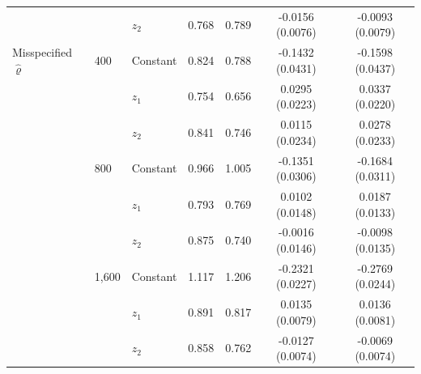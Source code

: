 \begin{tabular}{lllcccc}
 &  & $z_2$ & 0.768 & 0.789 & -0.0156 (0.0076) & -0.0093 (0.0079) \\
\addlinespace
Misspecified $\hat\varrho$ & 400 & Constant & 0.824 & 0.788 & -0.1432 (0.0431) & -0.1598 (0.0437) \\
 &  & $z_1$ & 0.754 & 0.656 & 0.0295 (0.0223) & 0.0337 (0.0220) \\
 &  & $z_2$ & 0.841 & 0.746 & 0.0115 (0.0234) & 0.0278 (0.0233) \\
 & 800 & Constant & 0.966 & 1.005 & -0.1351 (0.0306) & -0.1684 (0.0311) \\
 &  & $z_1$ & 0.793 & 0.769 & 0.0102 (0.0148) & 0.0187 (0.0133) \\
 &  & $z_2$ & 0.875 & 0.740 & -0.0016 (0.0146) & -0.0098 (0.0135) \\
 & 1,600 & Constant & 1.117 & 1.206 & -0.2321 (0.0227) & -0.2769 (0.0244) \\
 &  & $z_1$ & 0.891 & 0.817 & 0.0135 (0.0079) & 0.0136 (0.0081) \\
 &  & $z_2$ & 0.858 & 0.762 & -0.0127 (0.0074) & -0.0069 (0.0074) \\
\bottomrule
\end{tabular}
